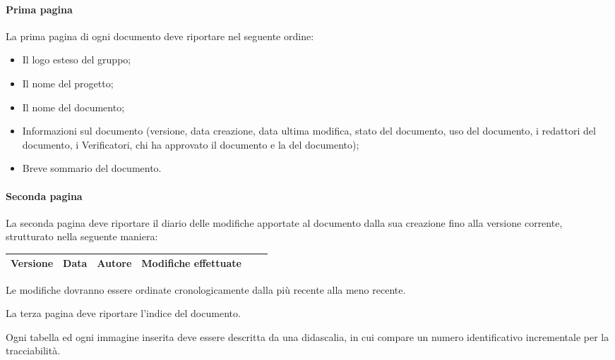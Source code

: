 \paragraph{Prima pagina}
\label{5.2.3}
La prima pagina di ogni documento deve riportare nel seguente ordine:
\begin{itemize}
\item Il logo esteso del gruppo;
\item Il nome del progetto;
\item Il nome del documento;
\item Informazioni sul documento (versione, data creazione, data ultima modifica, stato del documento, uso del documento, i redattori del documento, i Verificatori, chi ha approvato il documento e la  del documento);
\item Breve sommario del documento.
\end{itemize}

\paragraph{Seconda pagina}
\label{5.2.4}
La seconda pagina deve riportare il diario delle modifiche apportate al documento dalla sua creazione fino alla versione corrente, strutturato nella seguente maniera:

\begin{center}
\begin{longtable}{|c|c|c|p{0.5\linewidth}|}
\toprule
\textbf{Versione} & \textbf{Data} & \textbf{Autore} & \textbf{Modifiche effettuate}\\

\bottomrule
\end{longtable}
\end{center}
Le modifiche dovranno essere ordinate cronologicamente dalla più recente alla meno recente.



La terza pagina deve riportare l'indice del documento.


Ogni tabella ed ogni immagine inserita deve essere descritta da una didascalia, in cui compare un numero identificativo incrementale per la tracciabilità.

